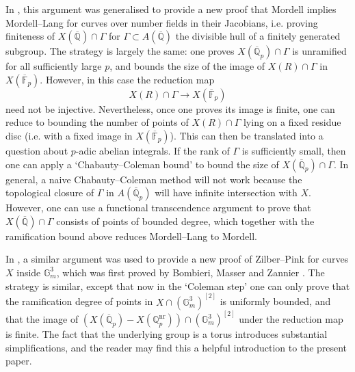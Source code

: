 \documentclass[11pt]{amsart}
\def\Q{\mathbb Q}
\theoremstyle{plain}
\theoremstyle{definition}
\newcommand{\nr}{\mathrm{nr}}
\newcommand{\F}{\mathbb{F}}
\begin{document}
In \cite{DP25}, this argument was generalised to provide a new proof that Mordell implies Mordell--Lang for curves over number fields in their Jacobians, i.e. proving finiteness of $X(\overline{\Q } )\cap \Gamma $ for $\Gamma \subset A(\overline{\Q })$ the divisible hull of a finitely generated subgroup. The strategy is largely the same: one proves $X(\overline{\Q }_p )\cap \Gamma $ is unramified for all sufficiently large $p$, and bounds the size of the image of $X(R)\cap \Gamma $ in $X(\overline{\F }_p )$. However, in this case the reduction map
\[
X(R)\cap \Gamma \to X(\overline{\F }_p )
\]
need not be injective. Nevertheless, once one proves its image is finite, one can reduce to bounding the number of points of $X(R)\cap \Gamma $ lying on a fixed residue disc (i.e. with a fixed image in $X(\overline{\F }_p )$). This can then be translated into a question about $p$-adic abelian integrals. If the rank of $\Gamma $ is sufficiently small, then one can apply a `Chabauty--Coleman bound' to bound the size of $X(\overline{\Q }_p )\cap \Gamma $. In general, a naive Chabauty--Coleman method will not work because the topological closure of $\Gamma $ in $A(\overline{\Q }_p )$ will have infinite intersection with $X$. However, one can use a functional transcendence argument to prove that $X(\overline{\Q })\cap \Gamma $ consists of points of bounded degree, which together with the ramification bound above reduces Mordell--Lang to Mordell.

In \cite{approaches}, a similar argument was used to provide a new proof of Zilber--Pink for curves $X$ inside $\mathbb{G}_m ^3 $, which was first proved by Bombieri, Masser and Zannier \cite{BMZ99}. The strategy is similar, except that now in the `Coleman step' one can only prove that the ramification degree of points in $X\cap (\mathbb{G}_m ^3  )^{[2]}$ is uniformly bounded, and that the image of $(X(\overline{\Q }_p )-X(\Q _p ^{\nr }))\cap (\mathbb{G}_m ^3 )^{[2]}$ under the reduction map is finite. The fact that the underlying group is a torus introduces substantial simplifications, and the reader may find this a helpful introduction to the present paper.
\end{document}
